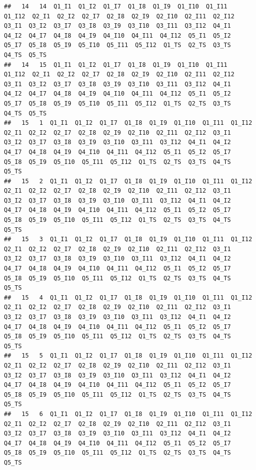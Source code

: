 \documentclass[]{book}
\begin{document}
\begin{verbatim}
##   14   14  Q1_I1  Q1_I2  Q1_I7  Q1_I8  Q1_I9  Q1_I10  Q1_I11  Q1_I12  Q2_I1  Q2_I2  Q2_I7  Q2_I8  Q2_I9  Q2_I10  Q2_I11  Q2_I12  Q3_I1  Q3_I2  Q3_I7  Q3_I8  Q3_I9  Q3_I10  Q3_I11  Q3_I12  Q4_I1  Q4_I2  Q4_I7  Q4_I8  Q4_I9  Q4_I10  Q4_I11  Q4_I12  Q5_I1  Q5_I2  Q5_I7  Q5_I8  Q5_I9  Q5_I10  Q5_I11  Q5_I12  Q1_TS  Q2_TS  Q3_TS  Q4_TS  Q5_TS
##   14   15  Q1_I1  Q1_I2  Q1_I7  Q1_I8  Q1_I9  Q1_I10  Q1_I11  Q1_I12  Q2_I1  Q2_I2  Q2_I7  Q2_I8  Q2_I9  Q2_I10  Q2_I11  Q2_I12  Q3_I1  Q3_I2  Q3_I7  Q3_I8  Q3_I9  Q3_I10  Q3_I11  Q3_I12  Q4_I1  Q4_I2  Q4_I7  Q4_I8  Q4_I9  Q4_I10  Q4_I11  Q4_I12  Q5_I1  Q5_I2  Q5_I7  Q5_I8  Q5_I9  Q5_I10  Q5_I11  Q5_I12  Q1_TS  Q2_TS  Q3_TS  Q4_TS  Q5_TS
##   15   1  Q1_I1  Q1_I2  Q1_I7  Q1_I8  Q1_I9  Q1_I10  Q1_I11  Q1_I12  Q2_I1  Q2_I2  Q2_I7  Q2_I8  Q2_I9  Q2_I10  Q2_I11  Q2_I12  Q3_I1  Q3_I2  Q3_I7  Q3_I8  Q3_I9  Q3_I10  Q3_I11  Q3_I12  Q4_I1  Q4_I2  Q4_I7  Q4_I8  Q4_I9  Q4_I10  Q4_I11  Q4_I12  Q5_I1  Q5_I2  Q5_I7  Q5_I8  Q5_I9  Q5_I10  Q5_I11  Q5_I12  Q1_TS  Q2_TS  Q3_TS  Q4_TS  Q5_TS
##   15   2  Q1_I1  Q1_I2  Q1_I7  Q1_I8  Q1_I9  Q1_I10  Q1_I11  Q1_I12  Q2_I1  Q2_I2  Q2_I7  Q2_I8  Q2_I9  Q2_I10  Q2_I11  Q2_I12  Q3_I1  Q3_I2  Q3_I7  Q3_I8  Q3_I9  Q3_I10  Q3_I11  Q3_I12  Q4_I1  Q4_I2  Q4_I7  Q4_I8  Q4_I9  Q4_I10  Q4_I11  Q4_I12  Q5_I1  Q5_I2  Q5_I7  Q5_I8  Q5_I9  Q5_I10  Q5_I11  Q5_I12  Q1_TS  Q2_TS  Q3_TS  Q4_TS  Q5_TS
##   15   3  Q1_I1  Q1_I2  Q1_I7  Q1_I8  Q1_I9  Q1_I10  Q1_I11  Q1_I12  Q2_I1  Q2_I2  Q2_I7  Q2_I8  Q2_I9  Q2_I10  Q2_I11  Q2_I12  Q3_I1  Q3_I2  Q3_I7  Q3_I8  Q3_I9  Q3_I10  Q3_I11  Q3_I12  Q4_I1  Q4_I2  Q4_I7  Q4_I8  Q4_I9  Q4_I10  Q4_I11  Q4_I12  Q5_I1  Q5_I2  Q5_I7  Q5_I8  Q5_I9  Q5_I10  Q5_I11  Q5_I12  Q1_TS  Q2_TS  Q3_TS  Q4_TS  Q5_TS
##   15   4  Q1_I1  Q1_I2  Q1_I7  Q1_I8  Q1_I9  Q1_I10  Q1_I11  Q1_I12  Q2_I1  Q2_I2  Q2_I7  Q2_I8  Q2_I9  Q2_I10  Q2_I11  Q2_I12  Q3_I1  Q3_I2  Q3_I7  Q3_I8  Q3_I9  Q3_I10  Q3_I11  Q3_I12  Q4_I1  Q4_I2  Q4_I7  Q4_I8  Q4_I9  Q4_I10  Q4_I11  Q4_I12  Q5_I1  Q5_I2  Q5_I7  Q5_I8  Q5_I9  Q5_I10  Q5_I11  Q5_I12  Q1_TS  Q2_TS  Q3_TS  Q4_TS  Q5_TS
##   15   5  Q1_I1  Q1_I2  Q1_I7  Q1_I8  Q1_I9  Q1_I10  Q1_I11  Q1_I12  Q2_I1  Q2_I2  Q2_I7  Q2_I8  Q2_I9  Q2_I10  Q2_I11  Q2_I12  Q3_I1  Q3_I2  Q3_I7  Q3_I8  Q3_I9  Q3_I10  Q3_I11  Q3_I12  Q4_I1  Q4_I2  Q4_I7  Q4_I8  Q4_I9  Q4_I10  Q4_I11  Q4_I12  Q5_I1  Q5_I2  Q5_I7  Q5_I8  Q5_I9  Q5_I10  Q5_I11  Q5_I12  Q1_TS  Q2_TS  Q3_TS  Q4_TS  Q5_TS
##   15   6  Q1_I1  Q1_I2  Q1_I7  Q1_I8  Q1_I9  Q1_I10  Q1_I11  Q1_I12  Q2_I1  Q2_I2  Q2_I7  Q2_I8  Q2_I9  Q2_I10  Q2_I11  Q2_I12  Q3_I1  Q3_I2  Q3_I7  Q3_I8  Q3_I9  Q3_I10  Q3_I11  Q3_I12  Q4_I1  Q4_I2  Q4_I7  Q4_I8  Q4_I9  Q4_I10  Q4_I11  Q4_I12  Q5_I1  Q5_I2  Q5_I7  Q5_I8  Q5_I9  Q5_I10  Q5_I11  Q5_I12  Q1_TS  Q2_TS  Q3_TS  Q4_TS  Q5_TS

\end{verbatim}
\end{document}
